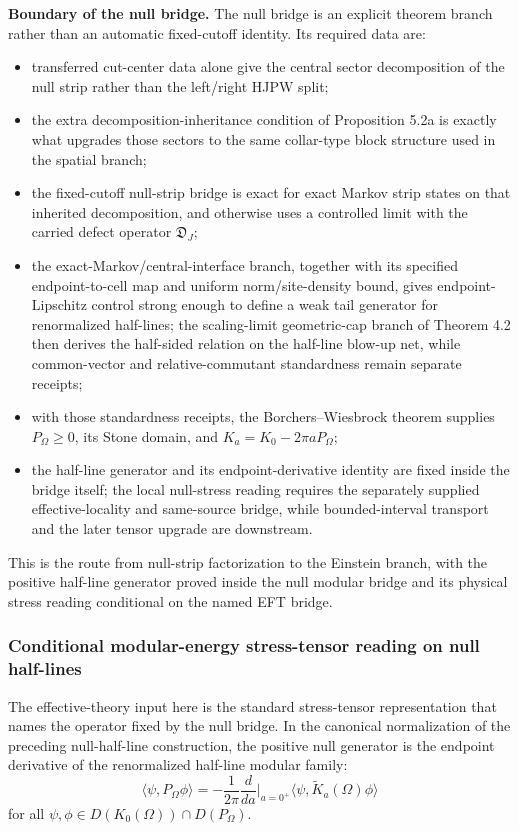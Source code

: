 \textbf{Boundary of the null bridge.} The null bridge is an explicit theorem branch rather than an automatic fixed-cutoff identity. Its required data are:
\begin{itemize}
\tightlist
\item
  transferred cut-center data alone give the central sector decomposition of the null strip rather than the left/right HJPW split;
\item
  the extra decomposition-inheritance condition of Proposition 5.2a is exactly what upgrades those sectors to the same collar-type block structure used in the spatial branch;
\item
  the fixed-cutoff null-strip bridge is exact for exact Markov strip states on that inherited decomposition, and otherwise uses a controlled limit with the carried defect operator \(\mathfrak D_J\);
\item
  the exact-Markov/central-interface branch, together with its specified endpoint-to-cell map and uniform norm/site-density bound, gives endpoint-Lipschitz control strong enough to define a weak tail generator for renormalized half-lines; the scaling-limit geometric-cap branch of Theorem 4.2 then derives the half-sided relation on the half-line blow-up net, while common-vector and relative-commutant standardness remain separate receipts;
\item
  with those standardness receipts, the Borchers--Wiesbrock theorem supplies \(P_\Omega\geq0\), its Stone domain, and \(K_a=K_0-2\pi aP_\Omega\);
\item
  the half-line generator and its endpoint-derivative identity are fixed inside the bridge itself; the local null-stress reading requires the separately supplied effective-locality and same-source bridge, while bounded-interval transport and the later tensor upgrade are downstream.
\end{itemize}
This is the route from null-strip factorization to the Einstein branch, with the positive half-line generator proved inside the null modular bridge and its physical stress reading conditional on the named EFT bridge.
\subsubsection{Conditional modular-energy stress-tensor reading on null half-lines}\label{53-modular-energy-as-stress-tensor-charge-uv-cft}

The effective-theory input here is the standard stress-tensor representation that names the operator fixed by the null bridge. In the canonical normalization of the preceding null-half-line construction, the positive null generator is the endpoint derivative of the renormalized half-line modular family:
\[
\langle\psi,P_\Omega\phi\rangle
=
-\frac{1}{2\pi}\frac{d}{da}\Big|_{a=0^+}
\langle\psi,\widetilde K_a(\Omega)\phi\rangle
\]
for all \(\psi,\phi\in D(K_0(\Omega))\cap D(P_\Omega)\).

